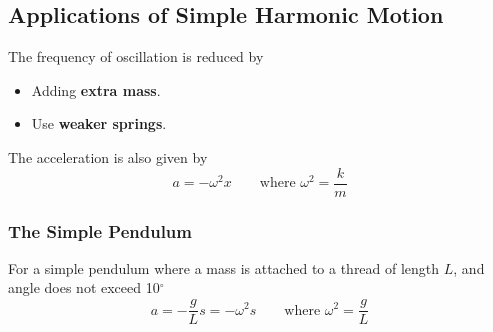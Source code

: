 \subsection{Applications of Simple Harmonic Motion}

The frequency of oscillation is reduced by
\begin{itemize}
    \item Adding \textbf{extra mass}.
    \item Use \textbf{weaker springs}.
\end{itemize}

The acceleration is also given by
$$a=-\omega^2x\qquad\text{where $\omega^2=\dfrac{k}{m}$}$$

\subsubsection*{The Simple Pendulum}

For a simple pendulum where a mass is attached to a thread of length $L$, and angle does not exceed 10$^\circ$
$$a=-\frac{g}{L}s=-\omega^2s\qquad\text{where $\omega^2=\dfrac{g}{L}$}$$
